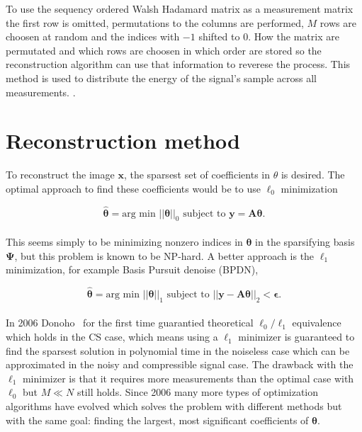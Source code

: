 To use the sequency ordered Walsh Hadamard matrix as a measurement matrix the first row is omitted, permutations to the columns are performed, $M$ rows are choosen at random and the indices with $-1$ shifted to $0$. How the matrix are permutated and which rows are choosen in which order are stored so the reconstruction algorithm can use that information to reverese the process. This method is used to distribute the energy of the signal's sample across all measurements.   \cite{article:SRM_long, article:TVAL3, article:an_improved_WH_matrix}. 


\section{Reconstruction method}
To reconstruct the image $\textbf{x}$, the sparsest set of coefficients in $\theta$ is desired. The optimal approach to find these coefficients would be to use $\ell_0$ minimization


\begin{equation}
   \mathbf{ \hat{\theta}} = \text{arg min } ||\mathbf{\theta}||_0 \text{  subject to  } \mathbf{y = A\theta} \text{.}
\end{equation}\\[0.1in]


This seems simply to be minimizing nonzero indices in $\mathbf{\theta}$ in the sparsifying basis $\mathbf{\Psi}$, but this problem is known to be NP-hard. A better approach is the $\ell_1$ minimization, for example Basis Pursuit denoise (BPDN),

\begin{equation}
    \mathbf{\hat{\theta}} = \text{arg min } ||\mathbf{\theta}||_1 \text{  subject to  } ||\mathbf{y - A\theta}||_2 < \mathbf{\epsilon} \text{.}
\end{equation}\\[0.1in]


In 2006 Donoho~\cite{article:CS_donoho1} for the first time guarantied theoretical $\ell_0\text{/}\ell_1$ equivalence which holds in the CS case, which means using a $\ell_1$ minimizer is guaranteed to find the sparsest solution in polynomial time in the noiseless case which can be approximated in the noisy and compressible signal case. The drawback with the $\ell_1$ minimizer is that it requires more measurements than the optimal case with $\ell_0$ but $M \ll N$ still holds. Since 2006 many more types of optimization algorithms have evolved which solves the problem with different methods but with the same goal: finding the largest, most significant coefficients of $\mathbf{\theta}$. \cite{article:CS_donoho1, article:single_pixel_im_cs, article:a_new_ci_arc}


